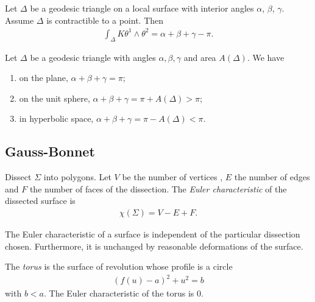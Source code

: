 \documentclass{article}
\begin{document}
\begin{theorem}[Notes 15.3]
    Let $\Delta$ be a geodesic triangle on a local surface with interior angles $\alpha$, $\beta$,
    $\gamma$. Assume $\Delta$ is contractible to a point. Then
    \begin{align*}
        \int_\Delta K\theta^1\wedge\theta^2 = \alpha + \beta + \gamma - \pi.
    \end{align*}
\end{theorem}

\begin{corollary}[Notes 15.4]
    Let $\Delta$ be a geodesic triangle with angles $\alpha,\beta,\gamma$ and area $A(\Delta)$.
    We have
    \begin{enumerate}
        \item on the plane, $\alpha+\beta+\gamma = \pi$;
        \item on the unit sphere, $\alpha + \beta + \gamma = \pi + A(\Delta) > \pi$;
        \item in hyperbolic space, $\alpha + \beta + \gamma = \pi - A(\Delta) < \pi$.
    \end{enumerate}
\end{corollary}

\subsection{Gauss-Bonnet}

\begin{definition}
    Dissect $\Sigma$ into polygons. Let $V$ be the number of vertices , $E$ the number of edges
    and $F$ the number of faces of the dissection. The \emph{Euler characteristic} of the
    dissected surface is
    \begin{align*}
        \chi(\Sigma) = V - E + F.
    \end{align*}
\end{definition}

\begin{proposition}[Notes 15.8]
    The Euler characteristic of a surface is independent of the particular dissection chosen.
    Furthermore, it is unchanged by reasonable deformations of the surface.
\end{proposition}

\begin{definition}
    The \emph{torus} is the surface of revolution whose profile is a circle
    \begin{align*}
        (f(u)-a)^2 + u^2 = b
    \end{align*}
    with $b<a$. The Euler characteristic of the torus is $0$.
\end{definition}
\end{document}
